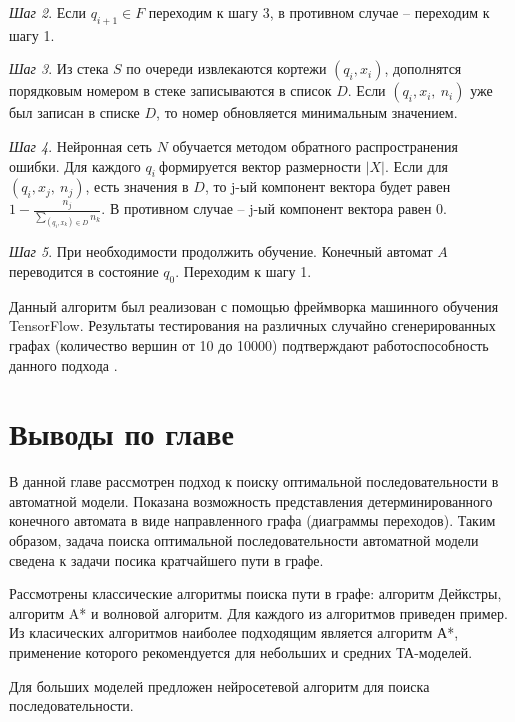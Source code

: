     \emph{Шаг 2}. Если \(q_{i + 1} \in F\) переходим к шагу 3, в противном
    случае -- переходим к шагу 1.
    
    \emph{Шаг 3}. Из стека \(S\) по очереди извлекаются кортежи
    \(\left( q_{i},x_{i} \right)\), дополнятся порядковым номером в стеке записываются в список \(D\). Если
    \(\left( q_{i},x_{i},\ n_{i} \right)\) уже был записан в списке \(D\),
    то номер обновляется минимальным значением.
    
    \emph{Шаг 4}. Нейронная сеть \(N\) обучается методом обратного
    распространения ошибки. Для каждого \(q_{i}\ \)формируется вектор
    размерности \(\left| X \right|\). Если для
    \(\left( q_{i},x_{j},\ n_{j} \right)\), есть значения в \(D\), то j-ый
    компонент вектора будет равен
    \(1 - \frac{n_{j}}{\sum_{\left( q_{i},x_{k} \right) \in D}^{}n_{k}}\). В
    противном случае -- j-ый компонент вектора равен 0.
    
    \emph{Шаг 5}. При необходимости продолжить обучение. Конечный автомат
    \(A\) переводится в состояние \(q_{0}\). Переходим к шагу 1. 
    
    Данный алгоритм был реализован с помощью фреймворка машинного обучения
    TensorFlow. Результаты тестирования на различных случайно
    сгенерированных графах (количество вершин от 10 до 10000) подтверждают
    работоспособность данного подхода \cite{mephi-2018}.


\section{Выводы по главе}

В данной главе рассмотрен подход к поиску оптимальной последовательности в автоматной модели.
Показана возможность представления детерминированного конечного автомата в виде направленного графа (диаграммы переходов).
Таким образом, задача поиска оптимальной последовательности автоматной модели сведена к задачи посика кратчайшего пути в графе.

Рассмотрены классические алгоритмы поиска пути в графе: алгоритм Дейкстры, алгоритм A* и волновой алгоритм.
Для каждого из алгоритмов приведен пример.
Из класических алгоритмов наиболее подходящим является алгоритм А*, применение которого рекомендуется для небольших и средних ТА-моделей.

Для больших моделей предложен нейросетевой алгоритм для поиска последовательности.